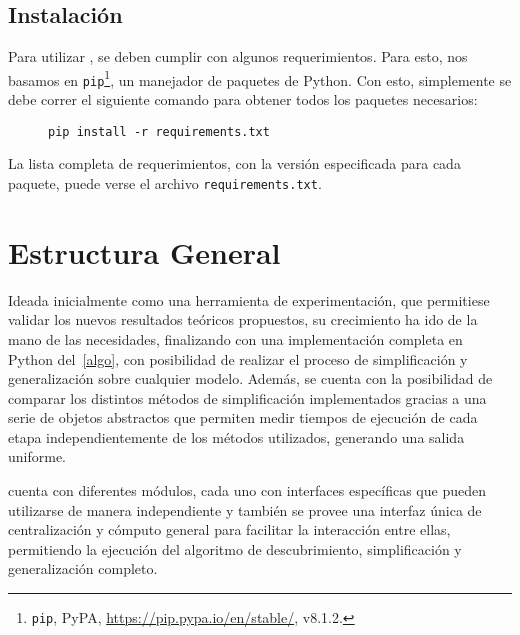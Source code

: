 
\subsection*{Instalación}
Para utilizar \pachtool, se deben cumplir con algunos requerimientos. Para esto, 
nos basamos en \texttt{pip}\footnote{\texttt{pip}, PyPA, \url{https://pip.pypa.io/en/stable/}, v8.1.2.},
un manejador de paquetes de Python. Con esto,
simplemente se debe correr el siguiente comando para obtener todos los
paquetes necesarios:

\begin{figure}[H]
    \centering
    \begin{Verbatim}[frame=single,fontsize=\scriptsize]
        pip install -r requirements.txt
    \end{Verbatim}
    \label{ej:pip_install}
\end{figure}

La lista completa de requerimientos, con la versión especificada para cada paquete,
puede verse el archivo \texttt{requirements.txt}.

\section{Estructura General}
\label{sec:4.general}

Ideada inicialmente como una herramienta de experimentación,
que permitiese validar los nuevos resultados teóricos propuestos, su crecimiento ha ido de la mano
de las necesidades, finalizando con una implementación completa en Python del~\autoref{algo},
con posibilidad de realizar el proceso de simplificación y generalización sobre cualquier modelo.
Además, se cuenta con la posibilidad de comparar los distintos métodos de simplificación
implementados gracias a una serie de objetos abstractos que permiten medir tiempos de 
ejecución de cada etapa independientemente de los métodos utilizados, 
generando una salida uniforme.

\pachtool cuenta con diferentes módulos, cada uno con interfaces específicas que pueden utilizarse de manera
independiente y también se provee una interfaz única de centralización y cómputo general para 
facilitar la interacción entre ellas, permitiendo la ejecución del algoritmo 
de descubrimiento, simplificación y generalización completo.

